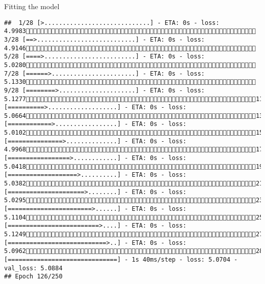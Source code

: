 \documentclass[
  ignorenonframetext,
]{beamer}
\begin{document}
\begin{frame}[fragile]{Fitting the model}
\begin{verbatim}
##  1/28 [>.............................] - ETA: 0s - loss: 4.9983 3/28 [==>...........................] - ETA: 0s - loss: 4.9146 5/28 [====>.........................] - ETA: 0s - loss: 5.0280 7/28 [======>.......................] - ETA: 0s - loss: 5.1330 9/28 [========>.....................] - ETA: 0s - loss: 5.127711/28 [==========>...................] - ETA: 0s - loss: 5.066413/28 [============>.................] - ETA: 0s - loss: 5.010215/28 [===============>..............] - ETA: 0s - loss: 4.996817/28 [=================>............] - ETA: 0s - loss: 5.041819/28 [===================>..........] - ETA: 0s - loss: 5.038221/28 [=====================>........] - ETA: 0s - loss: 5.029523/28 [=======================>......] - ETA: 0s - loss: 5.110425/28 [=========================>....] - ETA: 0s - loss: 5.124927/28 [===========================>..] - ETA: 0s - loss: 5.096228/28 [==============================] - 1s 40ms/step - loss: 5.0704 - val_loss: 5.0884
## Epoch 126/250

\end{verbatim}
\end{frame}
\end{document}
